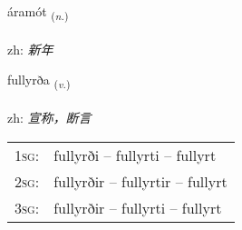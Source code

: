 \documentclass[frontgrid, backgrid]{flacards}\usepackage[]{graphicx}\usepackage[]{color}
\begin{document}
\renewcommand{\flhead}{\vskip5pt \fboxsep=0pt {\small\bfseries\footnotesize Nafnorð | 名词}}
\renewcommand{\fcfoot}{\vskip5pt \fboxsep=0pt \hspace{2pt}{\small\bfseries\footnotesize 2K}}

\renewcommand{\blhead}{\vskip5pt {\small\bfseries\footnotesize Nafnorð | 名词 }}
\renewcommand{\bcfoot}{\vskip5pt \hspace{2pt}{\small\bfseries\footnotesize 2K}}


{áramót \small{\textsubscript{(\textit{n.})}} \\[1ex] %
\textphonetic{[auːramout]} \\
zh: \emph{新年} \\  [2ex]
\renewcommand*{\arraystretch}{0.8}
}

\renewcommand{\flhead}{\vskip5pt \fboxsep=0pt {\small\bfseries\footnotesize Sagnorð | 动词}}
\renewcommand{\fcfoot}{\vskip5pt \fboxsep=0pt \hspace{2pt}{\small\bfseries\footnotesize 2K}}

\renewcommand{\blhead}{\vskip5pt {\small\bfseries\footnotesize Sagnorð | 动词 }}
\renewcommand{\bcfoot}{\vskip5pt \hspace{2pt}{\small\bfseries\footnotesize 2K}}


{fullyrða \small{\textsubscript{(\textit{v.})}} \\[1ex] %
\textphonetic{[fʏtlɪrða]} \\
zh: \emph{宣称，断言} \\  [2ex]
\renewcommand*{\arraystretch}{0.8}
\begin{tabular}{p{1cm}l}
\textsc{1sg}: & fullyrði -- fullyrti -- fullyrt \\ 
\textsc{2sg}: & fullyrðir -- fullyrtir -- fullyrt \\ 
\textsc{3sg}: & fullyrðir -- fullyrti -- fullyrt \\ 
\end{tabular}
}
\end{document}
